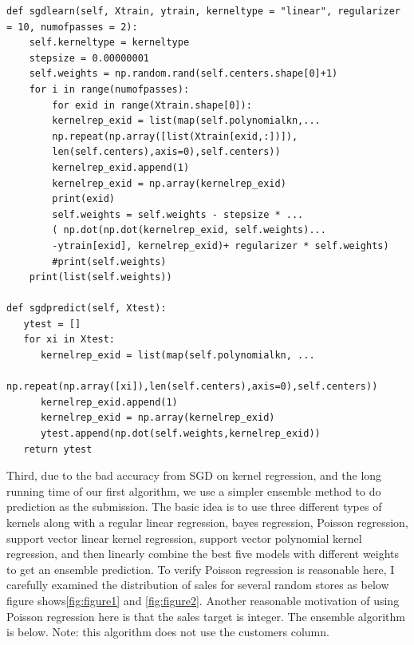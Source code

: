 \documentclass[11pt]{article}
\begin{document}
\begin{verbatim}
def sgdlearn(self, Xtrain, ytrain, kerneltype = "linear", regularizer = 10, numofpasses = 2):
    self.kerneltype = kerneltype
    stepsize = 0.00000001
    self.weights = np.random.rand(self.centers.shape[0]+1)
    for i in range(numofpasses):
        for exid in range(Xtrain.shape[0]):
        kernelrep_exid = list(map(self.polynomialkn,...
        np.repeat(np.array([list(Xtrain[exid,:])]),
        len(self.centers),axis=0),self.centers))
        kernelrep_exid.append(1)
        kernelrep_exid = np.array(kernelrep_exid)
        print(exid)
        self.weights = self.weights - stepsize * ...
        ( np.dot(np.dot(kernelrep_exid, self.weights)...
        -ytrain[exid], kernelrep_exid)+ regularizer * self.weights)
        #print(self.weights)
    print(list(self.weights))
    
def sgdpredict(self, Xtest):
   ytest = []
   for xi in Xtest:
      kernelrep_exid = list(map(self.polynomialkn, ...
      np.repeat(np.array([xi]),len(self.centers),axis=0),self.centers))
      kernelrep_exid.append(1)
      kernelrep_exid = np.array(kernelrep_exid)
      ytest.append(np.dot(self.weights,kernelrep_exid))
   return ytest
\end{verbatim} 

Third, due to the bad accuracy from SGD on kernel regression, and the long running time of our first algorithm, we use a simpler ensemble method to do prediction as the submission. The basic idea is to use three different types of kernels along with a regular linear regression, bayes regression, Poisson regression, support vector linear kernel regression, support vector polynomial kernel regression, and then linearly combine the best five models with different weights to get an ensemble prediction. To verify Poisson regression is reasonable here, I carefully examined the distribution of sales for several random stores as below figure shows\ref{fig:figure1} and \ref{fig:figure2}. Another reasonable motivation of using Poisson regression here is that the sales target is integer. The ensemble algorithm is below. Note: this algorithm does not use the customers column.
\end{document}
